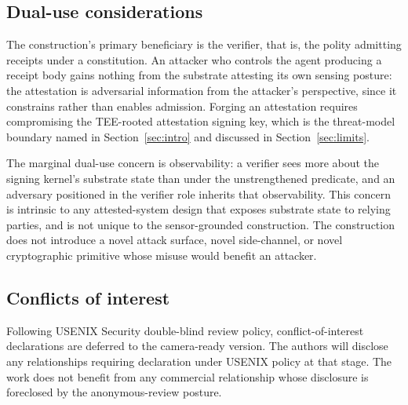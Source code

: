 \subsection{Dual-use considerations}

The construction's primary beneficiary is the verifier, that is, the
polity admitting receipts under a constitution. An attacker who
controls the agent producing a receipt body gains nothing from the
substrate attesting its own sensing posture: the attestation is
adversarial information from the attacker's perspective, since it
constrains rather than enables admission. Forging an attestation
requires compromising the TEE-rooted attestation signing key, which
is the threat-model boundary named in Section~\ref{sec:intro} and
discussed in Section~\ref{sec:limits}.

The marginal dual-use concern is observability: a verifier sees more
about the signing kernel's substrate state than under the
unstrengthened predicate, and an adversary positioned in the verifier
role inherits that observability. This concern is intrinsic to any
attested-system design that exposes substrate state to relying
parties, and is not unique to the sensor-grounded construction. The
construction does not introduce a novel attack surface, novel
side-channel, or novel cryptographic primitive whose misuse would
benefit an attacker.

\subsection{Conflicts of interest}

Following USENIX Security double-blind review policy, conflict-of-interest
declarations are deferred to the camera-ready version. The authors
will disclose any relationships requiring declaration under USENIX
policy at that stage. The work does not benefit from any commercial
relationship whose disclosure is foreclosed by the anonymous-review
posture.
